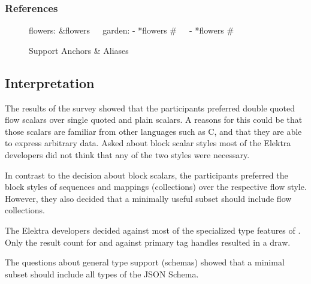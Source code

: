 \subsubsection{References}

\begin{figure}[H]
  \begin{minipage}[t]{0.48\textwidth}
    \vspace{0pt}
    \begin{bchart}[max=9, width=0.85\textwidth]
    \end{bchart}
  \end{minipage}
  \begin{minipage}[t]{0.48\textwidth}
    \vspace{0pt}
    \begin{yamlcode}
      flowers: &flowers
        🌳🌸🌼
      garden:
        - *flowers # 🌳🌸🌼
        - *flowers # 🌳🌸🌼
    \end{yamlcode}
  \end{minipage}
  \caption{Support Anchors \& Aliases}
\end{figure}

\subsection{Interpretation}

The results of the survey showed that the participants preferred double quoted flow scalars over single quoted and plain scalars. A reasons for this could be that those scalars are familiar from other languages such as C, and that they are able to express arbitrary data. Asked about block scalar styles most of the Elektra developers did not think that any of the two styles were necessary.

In contrast to the decision about block scalars, the participants preferred the block styles of sequences and mappings (\glspl{collection}) over the respective flow style. However, they also decided that a minimally useful  subset should include flow \glspl{collection}.

The Elektra developers decided against most of the specialized type features of . Only the result count for and against primary tag handles resulted in a draw.

The questions about general type support (schemas) showed that a minimal  subset should include all types of the JSON Schema.


